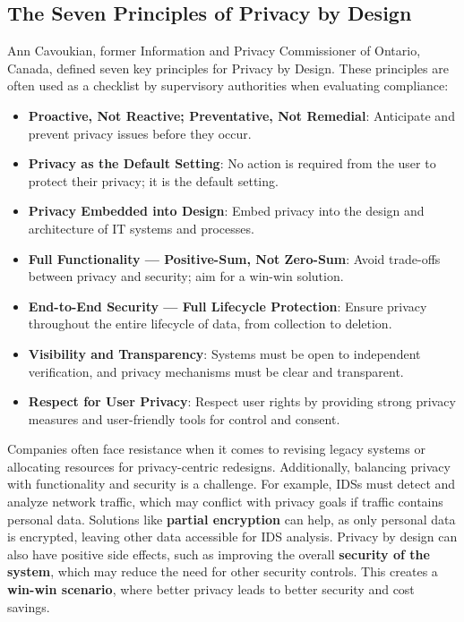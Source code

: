 \subsection{The Seven Principles of Privacy by Design}  
Ann Cavoukian, former Information and Privacy Commissioner of Ontario,
Canada, defined seven key principles for Privacy by Design. These
principles are often used as a checklist by supervisory authorities
when evaluating compliance:  
\begin{itemize}
  \item \textbf{Proactive, Not Reactive; Preventative, Not Remedial}:
    Anticipate and prevent privacy issues before they occur.  
  \item \textbf{Privacy as the Default Setting}: No action is required
    from the user to protect their privacy; it is the default setting.  
  \item \textbf{Privacy Embedded into Design}: Embed privacy into the
    design and architecture of IT systems and processes.  
  \item \textbf{Full Functionality — Positive-Sum, Not Zero-Sum}:
    Avoid trade-offs between privacy and security; aim for a win-win
    solution.  
  \item \textbf{End-to-End Security — Full Lifecycle Protection}:
    Ensure privacy throughout the entire lifecycle of data, from
    collection to deletion.  
  \item \textbf{Visibility and Transparency}: Systems must be open to
    independent verification, and privacy mechanisms must be clear and
    transparent.  
  \item \textbf{Respect for User Privacy}: Respect user rights by
    providing strong privacy measures and user-friendly tools for
    control and consent.  
\end{itemize}

 Companies often face resistance when it comes to revising legacy
 systems or allocating resources for privacy-centric redesigns.
 Additionally, balancing privacy with functionality and security is a
 challenge. For example, IDSs must detect and analyze network traffic,
 which may conflict with privacy goals if traffic contains personal
 data. Solutions like \textbf{partial encryption} can help, as only
 personal data is encrypted, leaving other data accessible for IDS
 analysis. Privacy by design can also have positive side effects, such
 as improving the overall \textbf{security of the system}, which may
 reduce the need for other security controls. This creates a
 \textbf{win-win scenario}, where better privacy leads to better
 security and cost savings.  


